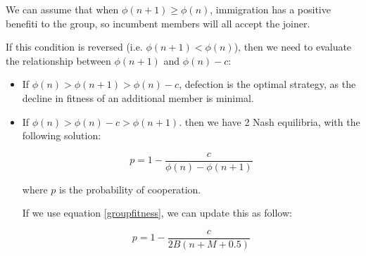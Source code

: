 \documentclass{article}
\begin{document}
We can assume that when $\phi(n+1)\geq\phi(n)$, immigration has a positive benefiti to the group, so incumbent members will all accept the joiner.

If this condition is reversed (i.e. $\phi(n+1)<\phi(n)$), then we need to evaluate the relationship between $\phi(n+1)$ and $\phi(n)-c$:

\begin{itemize}
\item If $\phi(n) > \phi(n+1) > \phi(n)-c$, defection is the optimal strategy, as the decline in fitness of an additional member is minimal.

\item If $\phi(n) > \phi(n) -c  > \phi(n+1)$. then we have 2 Nash equilibria, with the following solution:


\begin{equation}
 p = 1-\frac{c}{\phi(n)-\phi(n+1)}
\end{equation}

where $p$ is the probability of cooperation.










If we use equation \ref{groupfitness}, we can update this as follow:

\begin{equation}
p = 1-\frac{c}{2B(n+M+0.5)}
\end{equation}




\end{itemize}
\end{document}
